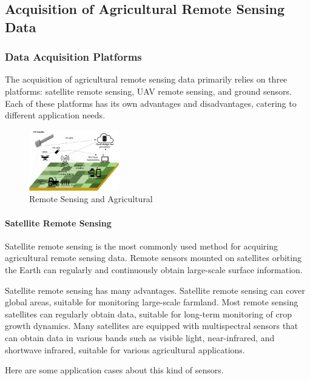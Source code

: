 \subsection{Acquisition of Agricultural Remote Sensing Data}

\subsubsection{Data Acquisition Platforms}
The acquisition of agricultural remote sensing data primarily relies on three platforms: satellite remote sensing, UAV\cite{Unmanned27:online} remote sensing, and ground sensors\cite{mandalImpactAgriculturalManagement2022}. Each of these platforms has its own advantages and disadvantages, catering to different application needs.

\begin{figure}[htbp!]
    \centering
    \includegraphics[width=0.35\textwidth]{figs/remote_sensing.png}
    \caption{Remote Sensing and Agricultural}
\end{figure}

\paragraph{Satellite Remote Sensing}

Satellite remote sensing is the most commonly used method for acquiring agricultural remote sensing data. Remote sensors mounted on satellites orbiting the Earth can regularly and continuously obtain large-scale surface information.

Satellite remote sensing has many advantages. Satellite remote sensing can cover global areas, suitable for monitoring large-scale farmland. Most remote sensing satellites can regularly obtain data, suitable for long-term monitoring of crop growth dynamics. Many satellites are equipped with multispectral sensors that can obtain data in various bands such as visible light, near-infrared, and shortwave infrared, suitable for various agricultural applications\cite{sahooHyperspectralRemoteSensing2015}.


Here are some application cases about this kind of sensors.


